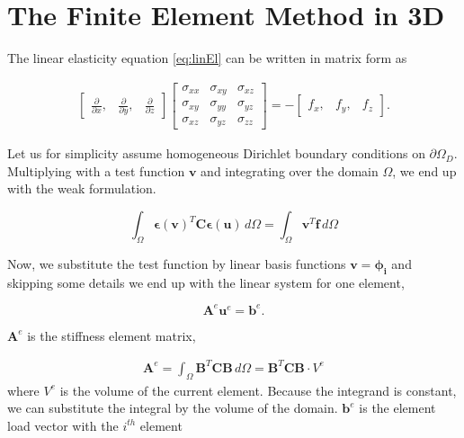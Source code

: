 \section{The Finite Element Method in 3D}
\label{sec:FEM}

The linear elasticity equation \eqref{eq:linEl} can be written in matrix form as

\begin{align*}
\begin{bmatrix}
\frac{\partial}{\partial x}, & \frac{\partial}{\partial y}, & \frac{\partial}{\partial z}
\end{bmatrix}
\begin{bmatrix}
\sigma_{xx} & \sigma_{xy} & \sigma_{xz} \\
\sigma_{xy} & \sigma_{yy} & \sigma_{yz} \\
\sigma_{xz} & \sigma_{yz} & \sigma_{zz}
\end{bmatrix} = -
\begin{bmatrix}
f_x, & f_y, & f_z 
\end{bmatrix}.
\end{align*}

Let us for simplicity assume homogeneous Dirichlet boundary conditions on $\partial \Omega_D$. Multiplying with a test function $\bm{v}$ and integrating over the domain $\Omega$, we end up with the weak formulation. 

\begin{equation}
\int_\Omega \bm{\epsilon}(\bm{v})^T \bm{C} \bm{\epsilon}(\bm{u}) \, d\Omega = \int_\Omega \bm{v}^T \bm{f} \, d\Omega
\end{equation}

Now, we substitute the test function by linear basis functions $\bm{v} = \bm{\phi_i}$ and skipping some details we end up with the linear system for one element,

\begin{equation}
\label{eq:linear-system}
\bm{A}^e \bm{u}^e = \bm{b}^e.
\end{equation}

$\bm{A}^e$ is the stiffness element matrix,

\begin{align}
\bm{A}^e = \int_\Omega \bm{B}^T \bm{C} \bm{B} \, d\Omega = \bm{B}^T \bm{C} \bm{B} \cdot V^e
\end{align}
where $V^e$ is the volume of the current element. Because the integrand is constant, we can substitute the integral by the volume of the domain. $\bm{b}^e$ is the element load vector with the $i^{th}$ element 

